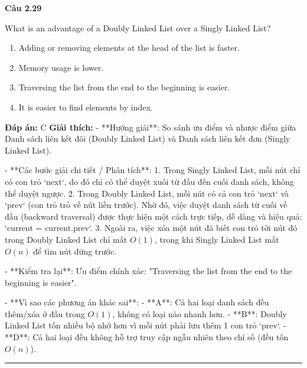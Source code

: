 \documentclass[11pt,a4paper]{article}
\newenvironment{question}[1]{%
  \par\vspace{1em}\noindent\textbf{\large Câu #1}\par\vspace{0.4em}
}{%
  \par\vspace{1em}\hrule\vspace{0.6em}
}
\newenvironment{choices}{%
  \begin{enumerate}[label=\textbf{\Alph*.},leftmargin=2.2em,itemsep=2pt,topsep=3pt]
}{%
  \end{enumerate}
}
\newcommand{\choice}{\item}
\begin{document}
\begin{question}{2.29}
What is an advantage of a Doubly Linked List over a Singly Linked List?
\begin{choices}
\choice Adding or removing elements at the head of the list is faster.
\choice Memory usage is lower.
\choice Traversing the list from the end to the beginning is easier.
\choice It is easier to find elements by index.
\end{choices}
\textbf{Đáp án:} C
\textbf{Giải thích:} - **Hướng giải**:
  So sánh ưu điểm và nhược điểm giữa Danh sách liên kết đôi (Doubly Linked List) và Danh sách liên kết đơn (Singly Linked List).

- **Các bước giải chi tiết / Phân tích**:
  1. Trong Singly Linked List, mỗi nút chỉ có con trỏ `next`, do đó chỉ có thể duyệt xuôi từ đầu đến cuối danh sách, không thể duyệt ngược.
  2. Trong Doubly Linked List, mỗi nút có cả con trỏ `next` và `prev` (con trỏ trỏ về nút liền trước). Nhờ đó, việc duyệt danh sách từ cuối về đầu (backward traversal) được thực hiện một cách trực tiếp, dễ dàng và hiệu quả: `current = current.prev`.
  3. Ngoài ra, việc xóa một nút đã biết con trỏ tới nút đó trong Doubly Linked List chỉ mất \(O(1)\), trong khi Singly Linked List mất \(O(n)\) để tìm nút đứng trước.

- **Kiểm tra lại**:
  Ưu điểm chính xác: "Traversing the list from the end to the beginning is easier".

- **Vì sao các phương án khác sai**:
  - **A**: Cả hai loại danh sách đều thêm/xóa ở đầu trong \(O(1)\), không có loại nào nhanh hơn.
  - **B**: Doubly Linked List tốn nhiều bộ nhớ hơn vì mỗi nút phải lưu thêm 1 con trỏ `prev`.
  - **D**: Cả hai loại đều không hỗ trợ truy cập ngẫu nhiên theo chỉ số (đều tốn \(O(n)\)).
\end{question}
\end{document}
